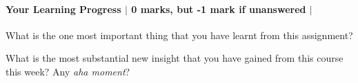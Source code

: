 \documentclass[10pt,letterpaper]{scrartcl}
\begin{document}
\paragraph*{Your Learning Progress $\vert$ 0 marks, but -1 mark if unanswered $\vert$ \faFilePdfO}
What is the one most important thing that you have learnt from this assignment?

\vspace*{3mm}
\hrulefill

\vspace*{3mm}
\hrulefill

\vspace*{3mm}
\hrulefill

What is the most substantial new insight that you have gained from this course this week? Any \emph{aha moment}?

\vspace*{3mm}
\hrulefill

\vspace*{3mm}
\hrulefill

\vspace*{3mm}
\hrulefill
\end{document}
